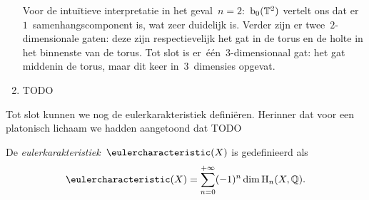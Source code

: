 \documentclass[a4paper,11pt,openany,oneside,article]{memoir}
\begin{document}
\begin{example}
\begin{enumerate}
      Voor de intu\"itieve interpretatie in het geval~$n=2$:~$\mathrm{b}_0(\mathbb{T}^2)$ vertelt ons dat er~$1$~samenhangscomponent is, wat zeer duidelijk is. Verder zijn er twee~$2$\nobreakdash-dimensionale gaten: deze zijn respectievelijk het gat in de torus en de holte in het binnenste van de torus. Tot slot is er~\'e\'en~$3$\nobreakdash-dimensionaal gat: het gat middenin de torus, maar dit keer in~$3$~dimensies opgevat.
      
    \item TODO

  \end{enumerate}
\end{example}

Tot slot kunnen we nog de eulerkarakteristiek defini\"eren. Herinner dat voor een platonisch lichaam we hadden aangetoond dat TODO

\begin{definition}
  De \emph{eulerkarakteristiek}~$\eulercharacteristic(X)$ is gedefinieerd als
  \begin{equation}
    \eulercharacteristic(X)=\sum_{n=0}^{+\infty}(-1)^n\dim\homologyGroup_n(X,\mathbb{Q}).
  \end{equation}
\end{definition}




\nocite{*}


\end{document}

